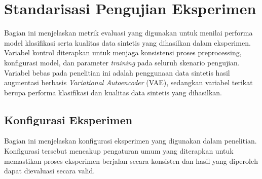 \section{Standarisasi Pengujian Eksperimen}
Bagian ini menjelaskan metrik evaluasi yang digunakan untuk menilai performa model klasifikasi serta kualitas data sintetis yang dihasilkan dalam eksperimen. Variabel kontrol diterapkan untuk menjaga konsistensi proses preprocessing, konfigurasi model, dan parameter \textit{training} pada seluruh skenario pengujian. Variabel bebas pada penelitian ini adalah penggunaan data sintetis hasil augmentasi berbasis \textit{Variational Autoencoder} (VAE), sedangkan variabel terikat berupa performa klasifikasi dan kualitas data sintetis yang dihasilkan.
\subsection{Konfigurasi Eksperimen}

Bagian ini menjelaskan konfigurasi eksperimen yang digunakan dalam penelitian. Konfigurasi tersebut mencakup pengaturan umum yang diterapkan untuk memastikan proses eksperimen berjalan secara konsisten dan hasil yang diperoleh dapat dievaluasi secara valid.

